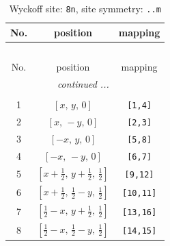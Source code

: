 \documentclass[fleqn,8pt]{jsarticle}
\begin{document}
\begin{longtable}{ccc}
\caption{Wyckoff site: {\tt 8n}, site symmetry: {\tt ..m}}
 \\
 \hline \hline
No. & position & mapping \\ \hline \endfirsthead

\multicolumn{2}{l}{\tablename\ \thetable{}} \\
 \hline \hline
No. & position & mapping \\ \hline \endhead

 \hline \hline
\multicolumn{2}{r}{\footnotesize\it continued ...} \\ \endfoot

 \hline \hline
\multicolumn{2}{r}{} \\ \endlastfoot

1 & $\left[ x,\, y,\, 0 \right]$ & {\tt [1,4]} \\ \hline
2 & $\left[ x,\, - y,\, 0 \right]$ & {\tt [2,3]} \\ \hline
3 & $\left[ - x,\, y,\, 0 \right]$ & {\tt [5,8]} \\ \hline
4 & $\left[ - x,\, - y,\, 0 \right]$ & {\tt [6,7]} \\ \hline
5 & $\left[ x + \frac{1}{2},\, y + \frac{1}{2},\, \frac{1}{2} \right]$ & {\tt [9,12]} \\ \hline
6 & $\left[ x + \frac{1}{2},\, \frac{1}{2} - y,\, \frac{1}{2} \right]$ & {\tt [10,11]} \\ \hline
7 & $\left[ \frac{1}{2} - x,\, y + \frac{1}{2},\, \frac{1}{2} \right]$ & {\tt [13,16]} \\ \hline
8 & $\left[ \frac{1}{2} - x,\, \frac{1}{2} - y,\, \frac{1}{2} \right]$ & {\tt [14,15]} \\
\end{longtable}
\renewcommand{\arraystretch}{1.2}
\end{document}
